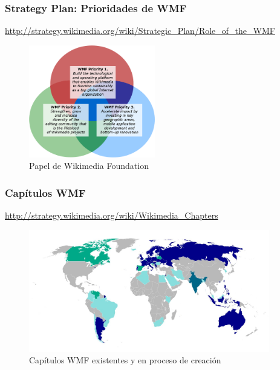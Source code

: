 
\begin{frame}
\frametitle{Strategy Plan: Prioridades de WMF}

\small{\url{http://strategy.wikimedia.org/wiki/Strategic_Plan/Role_of_the_WMF}}

    \begin{figure}[htp]
    \centering
    \includegraphics[width=5.5cm]{figs/WMF-Priorities.png}
    \caption{Papel de Wikimedia Foundation}
    \end{figure}

\end{frame}


\begin{frame}
\frametitle{Capítulos WMF}

\url{http://strategy.wikimedia.org/wiki/Wikimedia_Chapters}

    \begin{figure}[htp]
    \centering
    \includegraphics[width=10.5cm]{figs/Wikimedia-chapters.jpg}
    \caption{Capítulos WMF existentes y en proceso de creación}
    \end{figure}

\end{frame}


